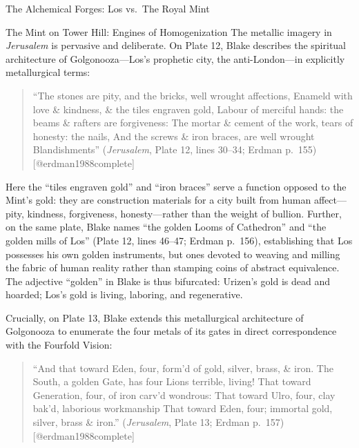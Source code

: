 \documentclass[
  ignorenonframetext,
]{beamer}
\begin{document}
\begin{frame}{The Alchemical Forges: Los vs.~The Royal Mint}
\begin{block}{The Mint on Tower Hill: Engines of Homogenization}
The metallic imagery in \emph{Jerusalem} is pervasive and deliberate. On
Plate 12, Blake describes the spiritual architecture of
Golgonooza---Los's prophetic city, the anti-London---in explicitly
metallurgical terms:

\begin{quote}
``The stones are pity, and the bricks, well wrought affections, Enameld
with love \& kindness, \& the tiles engraven gold, Labour of merciful
hands: the beams \& rafters are forgiveness: The mortar \& cement of the
work, tears of honesty: the nails, And the screws \& iron braces, are
well wrought Blandishments'' (\emph{Jerusalem}, Plate 12, lines 30--34;
Erdman p.~155) {[}@erdman1988complete{]}
\end{quote}

Here the ``tiles engraven gold'' and ``iron braces'' serve a function
opposed to the Mint's gold: they are construction materials for a city
built from human affect---pity, kindness, forgiveness, honesty---rather
than the weight of bullion. Further, on the same plate, Blake names
``the golden Looms of Cathedron'' and ``the golden mills of Los'' (Plate
12, lines 46--47; Erdman p.~156), establishing that Los possesses his
own golden instruments, but ones devoted to weaving and milling the
fabric of human reality rather than stamping coins of abstract
equivalence. The adjective ``golden'' in Blake is thus bifurcated:
Urizen's gold is dead and hoarded; Los's gold is living, laboring, and
regenerative.

Crucially, on Plate 13, Blake extends this metallurgical architecture of
Golgonooza to enumerate the four metals of its gates in direct
correspondence with the Fourfold Vision:

\begin{quote}
``And that toward Eden, four, form'd of gold, silver, brass, \& iron.
The South, a golden Gate, has four Lions terrible, living! That toward
Generation, four, of iron carv'd wondrous: That toward Ulro, four, clay
bak'd, laborious workmanship That toward Eden, four; immortal gold,
silver, brass \& iron.'' (\emph{Jerusalem}, Plate 13; Erdman p.~157)
{[}@erdman1988complete{]}
\end{quote}


\end{block}
\end{frame}
\end{document}
